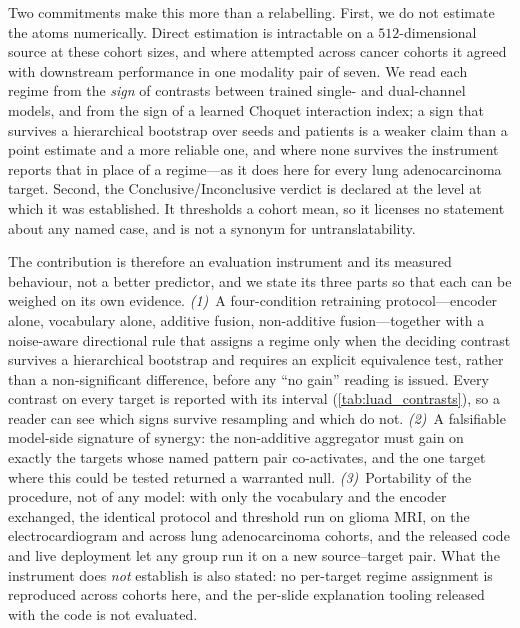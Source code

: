 Two commitments make this more than a relabelling. First, we do not
estimate the atoms numerically. Direct estimation is intractable on a
$512$-dimensional source at these cohort sizes, and where attempted
across cancer cohorts it agreed with downstream performance in
one modality pair of seven.\cite{zhang2025evaluatingpid} We read each
regime from the \emph{sign} of contrasts between trained single- and
dual-channel models, and from the sign of a learned Choquet interaction
index; a sign that survives a hierarchical bootstrap over seeds and
patients is a weaker claim than a point estimate and a more reliable
one, and where none survives the instrument reports that in place of a
regime---as it does here for every lung adenocarcinoma target. Second,
the Conclusive/Inconclusive verdict is declared at the level at which it
was established. It thresholds a cohort mean, so it licenses no statement
about any named case, and is not a synonym for untranslatability.

The contribution is therefore an evaluation instrument and its
measured behaviour, not a better predictor, and we state its three
parts so that each can be weighed on its own evidence.
\emph{(1)}~A four-condition retraining protocol---encoder alone,
vocabulary alone, additive fusion, non-additive fusion---together with a
noise-aware directional rule that assigns a regime only when the deciding
contrast survives a hierarchical bootstrap and requires an explicit
equivalence test, rather than a non-significant difference, before any
``no gain'' reading is issued. Every contrast on every target is
reported with its interval (\cref{tab:luad_contrasts}), so a reader can
see which signs survive resampling and which do not.
\emph{(2)}~A falsifiable model-side signature of synergy: the non-additive
aggregator must gain on exactly the targets whose named pattern pair
co-activates, and the one target where this could be tested returned a
warranted null. \emph{(3)}~Portability of the procedure, not of any
model: with only the vocabulary and the encoder exchanged, the identical
protocol and threshold run on glioma MRI, on the electrocardiogram and
across lung adenocarcinoma cohorts, and the released code and live
deployment let any group run it on a new source--target pair. What the
instrument does \emph{not} establish is also stated: no per-target regime
assignment is reproduced across cohorts here, and the per-slide
explanation tooling released with the code is not evaluated.

